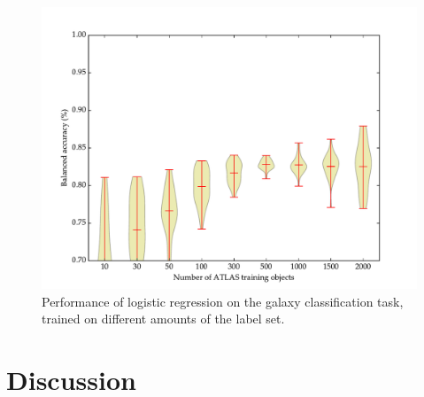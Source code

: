     \begin{figure}[!ht]
      \centering
      \includegraphics[width=\textwidth]{images/experiments/passive.pdf}
      \caption{Performance of logistic regression on the galaxy classification task, trained on different amounts of the \citeauthor{norris06} label set.}
    \end{figure}

\section{Discussion}
\label{sec:rgz-discussion}